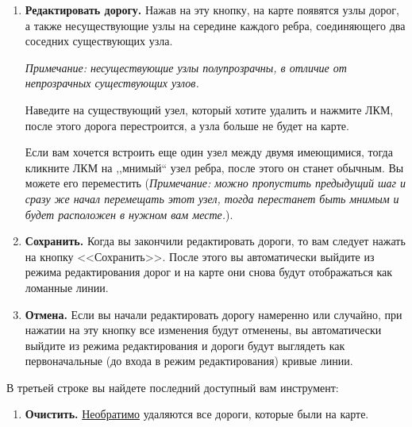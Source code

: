 \begin{enumerate}
	\item \textbf{Редактировать дорогу.} Нажав на эту кнопку, на карте появятся узлы дорог, а также несуществующие узлы на середине каждого ребра, соединяющего два соседних существующих узла.
	
	\textit{Примечание: несуществующие узлы полупрозрачны, в отличие от непрозрачных существующих узлов.}
	
	Наведите на существующий узел, который хотите удалить и нажмите ЛКМ, после этого дорога перестроится, а узла больше не будет на карте.
	
	Если вам хочется встроить еще один узел между двумя имеющимися, тогда кликните ЛКМ на ,,мнимый`` узел ребра, после этого он станет обычным. Вы можете его переместить (\textit{Примечание: можно пропустить предыдущий шаг и сразу же начал перемещать этот узел, тогда перестанет быть мнимым и будет расположен в нужном вам месте.}).
	\item \textbf{Сохранить.} Когда вы закончили редактировать дороги, то вам следует нажать на кнопку <<Сохранить>>. После этого вы автоматически выйдите из режима редактирования дорог и на карте они снова будут отображаться как ломанные линии.
	\item \textbf{Отмена.} Если вы начали редактировать дорогу намеренно или случайно, при нажатии на эту кнопку все изменения будут отменены, вы автоматически выйдите из режима редактирования и дороги будут выглядеть как первоначальные (до входа в режим редактирования) кривые линии.
\end{enumerate}

В третьей строке вы найдете последний доступный вам инструмент:

\begin{enumerate}
	\item \textbf{Очистить.} \underline{Необратимо} удаляются все дороги, которые были на карте.
\end{enumerate}
%
